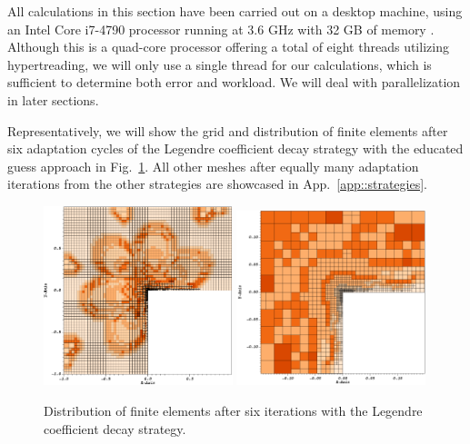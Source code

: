 All calculations in this section have been carried out on a desktop machine, using an Intel  Core i7-4790 processor running at 3.6 GHz with 32 GB of memory . Although this is a quad-core processor offering a total of eight threads utilizing hypertreading, we will only use a single thread for our calculations, which is sufficient to determine both error and workload. We will deal with parallelization in later sections.



Representatively, we will show the grid and distribution of finite elements after six adaptation cycles of the Legendre coefficient decay strategy with the educated guess approach in Fig.~\ref{fig:fedegrees}. All other meshes after equally many adaptation iterations from the other strategies are showcased in App.~\ref{app::strategies}.

\begin{figure}
\centering
\includegraphics[width=0.49\textwidth]{figures/results/corner-2d-error-hp-legendre-05_fedegrees.png}
\includegraphics[width=0.49\textwidth]{figures/results/corner-2d-error-hp-legendre-05_fedegrees_zoom.png}
\caption{Distribution of finite elements after six iterations with the Legendre coefficient decay strategy.}
\label{fig:fedegrees}
\end{figure}

